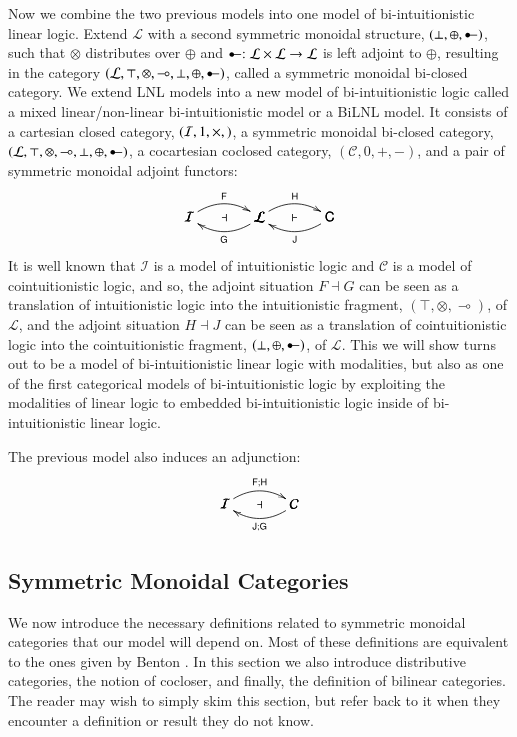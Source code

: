 \documentclass{lmcs}
\let\mto\to
\let\to\relax
\newcommand{\to}{\rightarrow}
\newcommand{\cat}[1]{\mathcal{#1}}
\newcommand{\func}[1]{\mathsf{#1}}
\newcommand{\limp}[0]{\multimap}
\newcommand{\colimp}[0]{\multimapdotinv}
\begin{document}
Now we combine the two previous models into one model of
bi-intuitionistic linear logic.  Extend $\cat{L}$ with a second
symmetric monoidal structure, $(\perp, \oplus, \colimp)$, such that
$\otimes$ distributes over $\oplus$ and $\colimp : \cat{L} \times
\cat{L} \mto \cat{L}$ is left adjoint to $\oplus$, resulting in the
category $(\cat{L}, \top, \otimes, \limp, \perp, \oplus, \colimp)$,
called a symmetric monoidal bi-closed category.  We extend LNL models
into a new model of bi-intuitionistic logic called a mixed
linear/non-linear bi-intuitionistic model or a BiLNL model.  It
consists of a cartesian closed category, $(\cat{I}, 1, \times, \to)$,
a symmetric monoidal bi-closed category, $(\cat{L}, \top,\otimes,
\limp, \perp, \oplus, \colimp)$, a cocartesian coclosed category,
$(\cat{C}, 0,+, -)$, and a pair of symmetric monoidal adjoint
functors:
$$\bfig
\morphism(0,0)|a|/{@{>}@/^1em/}/<500,0>[\cat{I}`\cat{L};\func{F}]
\morphism(0,0)|b|/{@{<-}@/_1em/}/<500,0>[\cat{I}`\cat{L};\mathsf{G}]
\morphism(500,0)|a|/{@{>}@/^1em/}/<500,0>[\cat{L}`\func{C};\func{H}]
\morphism(500,0)|b|/{@{<-}@/_1em/}/<500,0>[\cat{L}`\func{C};\func{J}]
\place(250,0)[\dashv] \place(750,0)[\vdash] \efig$$ It is well known
that $\cat{I}$ is a model of intuitionistic logic and $\cat{C}$ is a
model of cointuitionistic logic, and so, the adjoint situation $F
\dashv G$ can be seen as a translation of intuitionistic logic into
the intuitionistic fragment, $(\top, \otimes, \limp)$, of $\cat{L}$,
and the adjoint situation $H \dashv J$ can be seen as a translation of
cointuitionistic logic into the cointuitionistic fragment, $(\perp,
\oplus, \colimp)$, of $\cat{L}$.  This we will show turns out to be a
model of bi-intuitionistic linear logic with modalities, but also as
one of the first categorical models of bi-intuitionistic logic by
exploiting the modalities of linear logic to embedded
bi-intuitionistic logic inside of bi-intuitionistic linear logic.

The previous model also induces an adjunction:
$$\bfig
\morphism(0,0)|a|/{@{>}@/^1em/}/<500,0>[\cat{I}`\cat{C};\func{F};\func{H}]
\morphism(0,0)|b|/{@{<-}@/_1em/}/<500,0>[\cat{I}`\cat{C};\func{J};\func{G}]
\place(250,0)[\dashv]\efig$$

\subsection{Symmetric Monoidal Categories}
\label{subsec:symmetric_monoidal_categories}
We now introduce the necessary definitions related to symmetric
monoidal categories that our model will depend on.  Most of these
definitions are equivalent to the ones given by Benton
\cite{Benton:1994}.  In this section we also introduce distributive
categories, the notion of cocloser, and finally, the definition of
bilinear categories.  The reader may wish to simply skim this section,
but refer back to it when they encounter a definition or result they
do not know.
\end{document}
